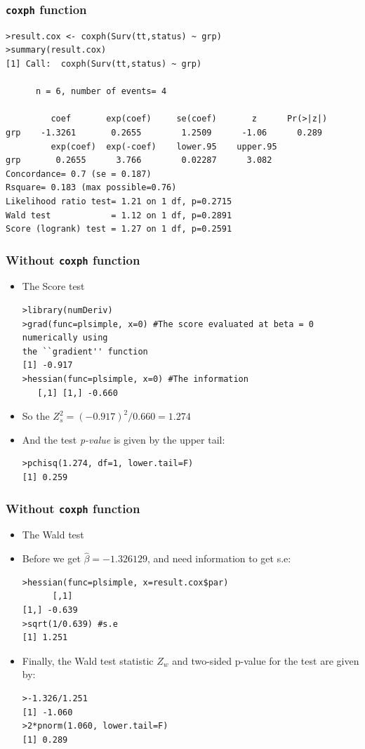 \documentclass{beamer}
\newcommand{\empr}[1]{{\emph{\color{red}#1}}}
\begin{document}
\pagebreak
\begin{frame}[fragile]
\frametitle{\texttt{coxph} function}

\begin{Verbatim}
>result.cox <- coxph(Surv(tt,status) ~ grp)
>summary(result.cox)
[1] Call:  coxph(Surv(tt,status) ~ grp)
      
      n = 6, number of events= 4
     
         coef       exp(coef)     se(coef)       z      Pr(>|z|)
grp    -1.3261       0.2655        1.2509      -1.06      0.289
         exp(coef)  exp(-coef)    lower.95    upper.95
grp       0.2655      3.766        0.02287      3.082
Concordance= 0.7 (se = 0.187)
Rsquare= 0.183 (max possible=0.76)
Likelihood ratio test= 1.21 on 1 df, p=0.2715
Wald test            = 1.12 on 1 df, p=0.2891
Score (logrank) test = 1.27 on 1 df, p=0.2591
\end{Verbatim}
\end{frame}

\pagebreak
\begin{frame}[fragile]
\frametitle{Without \texttt{coxph} function}
\begin{itemize}
\item The Score test
\begin{Verbatim}
>library(numDeriv)
>grad(func=plsimple, x=0) #The score evaluated at beta = 0 numerically using
the ``gradient'' function
[1] -0.917
>hessian(func=plsimple, x=0) #The information
   [,1] [1,] -0.660
\end{Verbatim}
\item So the $Z_{s}^{2} = (-0.917)^{2}/0.660 = 1.274$
\item And the test \empr{p-value} is given by the upper tail:
\begin{Verbatim}
>pchisq(1.274, df=1, lower.tail=F)
[1] 0.259
\end{Verbatim}
\end{itemize}
\end{frame}

\pagebreak
\begin{frame}[fragile]
\frametitle{Without \texttt{coxph} function}
\begin{itemize}
\item The Wald test
\item Before we get $\hat{\beta} = -1.326129$, and need information to get s.e:
\begin{Verbatim}
>hessian(func=plsimple, x=result.cox$par)
      [,1]
[1,] -0.639
>sqrt(1/0.639) #s.e
[1] 1.251
\end{Verbatim}
\item Finally, the Wald test statistic $Z_w$ and two-sided p-value for the test are given by:
\begin{Verbatim}
>-1.326/1.251
[1] -1.060
>2*pnorm(1.060, lower.tail=F) 
[1] 0.289
\end{Verbatim}
\end{itemize}
\end{frame}
\end{document}

